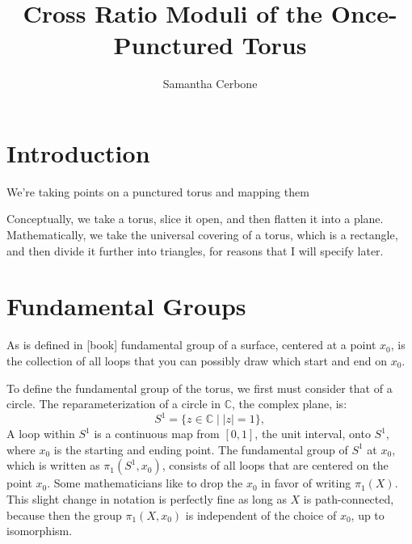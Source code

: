 \documentclass[12pt,a4paper,reqno,parskip=full]{amsart}
\numberwithin{equation}{section}
\theoremstyle{plain}
\theoremstyle{definition}
\def\C{{\mathbb C}}
\begin{document}
\title{Cross Ratio Moduli of the Once-Punctured Torus}

\author{Samantha Cerbone}

\maketitle

\section{Introduction}

We're taking points on a punctured torus and mapping them 

Conceptually, we take a torus, slice it open, and then flatten it into a plane. Mathematically, we take the universal covering of a torus, which is a rectangle, and then divide it further into triangles, for reasons that I will specify later.

\section{Fundamental Groups}

As is defined in [book] fundamental group of a surface, centered at a point $x_0$, is the collection of all loops that you can possibly draw which start and end on $x_0$. %

To define the fundamental group of the torus, we first must consider that of a circle. The reparameterization of a circle in $\C$, the complex plane, is:
\[S^1=\{z\in\C\mid |z|=1\},\]
A loop within $S^1$ is a continuous map from $[0,1]$, the unit interval, onto $S^1$, where $x_0$ is the starting and ending point. The fundamental group of $S^1$ at $x_0$, which is written as $\pi_1(S^1,x_0)$, consists of all loops that are centered on the point $x_0$. Some mathematicians like to drop the $x_0$ in favor of writing $\pi_1(X)$. This slight change in notation is perfectly fine as long as $X$ is path-connected, because then the group $\pi_1(X,x_0)$ is independent of the choice of $x_0$, up to isomorphism.
\end{document}
